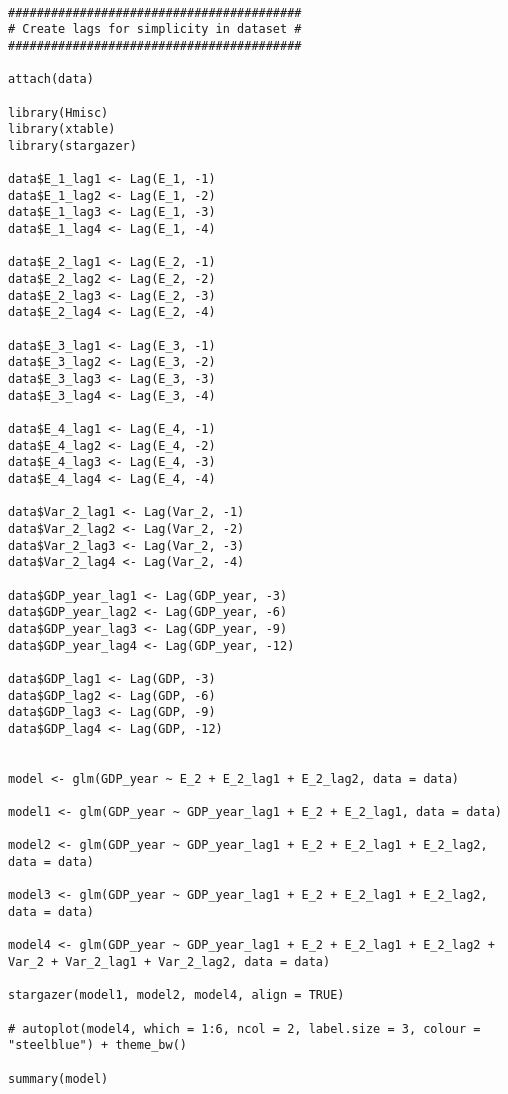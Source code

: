 \begin{lstlisting}
    






#########################################
# Create lags for simplicity in dataset #
#########################################

attach(data)

library(Hmisc)
library(xtable)
library(stargazer)

data$E_1_lag1 <- Lag(E_1, -1)
data$E_1_lag2 <- Lag(E_1, -2)
data$E_1_lag3 <- Lag(E_1, -3)
data$E_1_lag4 <- Lag(E_1, -4)

data$E_2_lag1 <- Lag(E_2, -1)
data$E_2_lag2 <- Lag(E_2, -2)
data$E_2_lag3 <- Lag(E_2, -3)
data$E_2_lag4 <- Lag(E_2, -4)

data$E_3_lag1 <- Lag(E_3, -1)
data$E_3_lag2 <- Lag(E_3, -2)
data$E_3_lag3 <- Lag(E_3, -3)
data$E_3_lag4 <- Lag(E_3, -4)

data$E_4_lag1 <- Lag(E_4, -1)
data$E_4_lag2 <- Lag(E_4, -2)
data$E_4_lag3 <- Lag(E_4, -3)
data$E_4_lag4 <- Lag(E_4, -4)

data$Var_2_lag1 <- Lag(Var_2, -1)
data$Var_2_lag2 <- Lag(Var_2, -2)
data$Var_2_lag3 <- Lag(Var_2, -3)
data$Var_2_lag4 <- Lag(Var_2, -4)

data$GDP_year_lag1 <- Lag(GDP_year, -3)
data$GDP_year_lag2 <- Lag(GDP_year, -6)
data$GDP_year_lag3 <- Lag(GDP_year, -9)
data$GDP_year_lag4 <- Lag(GDP_year, -12)

data$GDP_lag1 <- Lag(GDP, -3)
data$GDP_lag2 <- Lag(GDP, -6)
data$GDP_lag3 <- Lag(GDP, -9)
data$GDP_lag4 <- Lag(GDP, -12)


model <- glm(GDP_year ~ E_2 + E_2_lag1 + E_2_lag2, data = data)

model1 <- glm(GDP_year ~ GDP_year_lag1 + E_2 + E_2_lag1, data = data)

model2 <- glm(GDP_year ~ GDP_year_lag1 + E_2 + E_2_lag1 + E_2_lag2, data = data)

model3 <- glm(GDP_year ~ GDP_year_lag1 + E_2 + E_2_lag1 + E_2_lag2, data = data)

model4 <- glm(GDP_year ~ GDP_year_lag1 + E_2 + E_2_lag1 + E_2_lag2 + Var_2 + Var_2_lag1 + Var_2_lag2, data = data)

stargazer(model1, model2, model4, align = TRUE)

# autoplot(model4, which = 1:6, ncol = 2, label.size = 3, colour = "steelblue") + theme_bw()

summary(model)




\end{lstlisting}